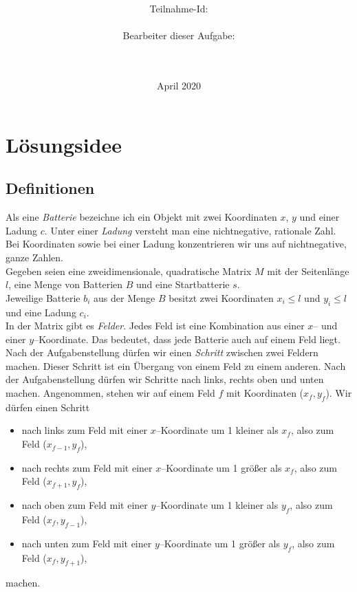 \documentclass[a4paper,10pt,ngerman]{scrartcl}
\title{\textbf{\Huge\Aufgabe}}
\author{\LARGE Teilnahme-Id: \LARGE \TeilnahmeId \\\\
	    \LARGE Bearbeiter dieser Aufgabe: \\ 
	    \LARGE \Namen\\\\}
\date{\LARGE April 2020}
\begin{document}
\maketitle
\tableofcontents

\vspace{0.5cm}

\section{Lösungsidee}
\subsection{Definitionen}

Als eine \textit{Batterie} bezeichne ich ein Objekt mit zwei Koordinaten $x$, $y$ und einer Ladung $c$.
Unter einer \textit{Ladung} versteht man eine nichtnegative, rationale Zahl.
Bei Koordinaten sowie bei einer Ladung konzentrieren wir uns auf nichtnegative, ganze Zahlen.\\

Gegeben seien eine zweidimensionale, quadratische Matrix $M$ mit der Seitenlänge $l$, eine Menge von Batterien $B$
und eine Startbatterie $s$.\\
Jeweilige Batterie $b_i$ aus der Menge $B$ besitzt zwei Koordinaten $x_i \leqslant l$ und $y_i \leqslant l$ und eine Ladung $c_i$.\\
In der Matrix gibt es \textit{Felder}. Jedes Feld ist eine Kombination aus einer $x$-- und einer $y$--Koordinate.
Das bedeutet, dass jede Batterie auch auf einem Feld liegt.\\

Nach der Aufgabenstellung dürfen wir einen \textit{Schritt} zwischen zwei Feldern machen. Dieser Schritt ist 
ein Übergang von einem Feld zu einem anderen. Nach der Aufgabenstellung dürfen wir Schritte nach links, rechts oben und unten machen.
Angenommen, stehen wir auf einem Feld $f$ mit Koordinaten ($x_f,y_f$). Wir dürfen einen Schritt
\begin{itemize}
\item nach links zum Feld mit einer $x$--Koordinate um 1 kleiner als $x_f$, also zum Feld ($x_{f-1},y_f$),
\item nach rechts zum Feld mit einer $x$--Koordinate um 1 größer als $x_f$, also zum Feld ($x_{f+1},y_f$),
\item nach oben zum Feld mit einer $y$--Koordinate um 1 kleiner als $y_f$, also zum Feld ($x_f,y_{f-1}$),
\item nach unten zum Feld mit einer $y$--Koordinate um 1 größer als $y_f$, also zum Feld ($x_f,y_{f+1}$),
\end{itemize}
machen.
\end{document}
